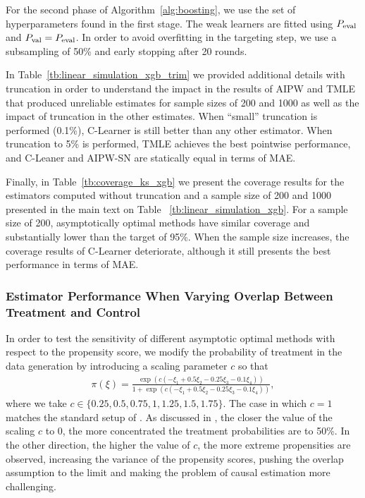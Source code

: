 For the second phase of Algorithm~\ref{alg:boosting}, we use the set of hyperparameters found in the first stage. The weak learners are fitted using $P_{\rm eval}$ and $P_{\rm val} = P_{\rm eval}$. In order to avoid overfitting in the targeting step, we use a subsampling of 50\% and early stopping after 20 rounds.

In Table~\ref{tb:linear_simulation_xgb_trim} we provided additional details with truncation in order to understand the impact in the results of AIPW and TMLE that produced unreliable estimates for sample sizes of 200 and 1000 as well as the impact of truncation in the other estimates. When ``small'' truncation is performed (0.1\%), C-Learner is still better than any other estimator. When truncation to 5\% is performed, TMLE achieves the best pointwise performance, and C-Leaner and AIPW-SN are statically equal in terms of MAE.

Finally, in Table~\ref{tb:coverage_ks_xgb} we present the coverage results for the estimators computed without truncation and a sample size of 200 and 1000 presented in the main text on Table ~\ref{tb:linear_simulation_xgb}. For a sample size of 200, asymptotically optimal methods have similar coverage and substantially lower than the target of 95\%. When the sample size increases, the coverage results of C-Learner deteriorate, although it still presents the best performance in terms of MAE. 


\subsubsection{Estimator Performance When Varying Overlap Between Treatment and Control}
\label{sec:ks_sensitivity}
In order to test the sensitivity of different asymptotic optimal methods with respect to the propensity score, we modify the probability of treatment in the data generation by introducing a scaling parameter $c$ so that
\begin{align}
\pi(\xi) = \frac{\exp(c(-\xi_{1} + 0.5 \xi_{2} - 0.25 \xi_{3} - 0.1 \xi_{4}))}{1+\exp(c(-\xi_{1} + 0.5 \xi_{2} - 0.25 \xi_{3} - 0.1 \xi_{4}))},
\label{eq:ks_variant_c}
\end{align}
where we take $c \in \{0.25, 0.5, 0.75, 1, 1.25, 1.5, 1.75\}$. The case in which $c = 1$ matches the standard setup of \cite{KangSc07}. As discussed in , the closer the value of the scaling $c$ to 0, the more concentrated the treatment probabilities are to 50\%. In the other direction, the higher the value of $c$, the more extreme propensities are observed, increasing the variance of the propensity scores, pushing the overlap assumption to the limit and making the problem of causal estimation more challenging.

